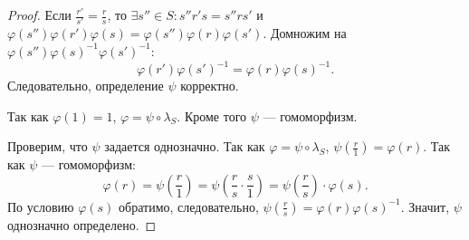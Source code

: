 \documentclass[11pt]{book}
\theoremstyle{definition}
\theoremstyle{plain}
\theoremstyle{plain}
\theoremstyle{definition}
\theoremstyle{remark}
\begin{document}
\begin{proof}
    Если $ \frac{r'}{s'} = \frac{r}{s}$, то $ \exists s'' \in S: s''r's = s''rs'$ и $ \varphi (s'')\varphi(r')\varphi(s) = \varphi (s'') \varphi (r) \varphi (s')$. Домножим на $ \varphi (s'') \varphi (s)^{-1} \varphi (s')^{-1}$:
    \[
	\varphi (r') \varphi (s')^{-1} = \varphi (r) \varphi (s)^{-1}
    .\]
    Следовательно, определение $ \psi$ корректно.

    Так как  $ \varphi (1) = 1$, $ \varphi = \psi \circ \lambda_S$.
    Кроме того $ \psi$ --- гомоморфизм.

    Проверим, что  $ \psi$ задается однозначно.
    Так как $ \varphi = \psi \circ \lambda_S$, $ \psi(\frac{r}{1}) = \varphi (r)$. Так как $ \psi$ --- гомоморфизм:
    \[
	\varphi (r) = \psi\left( \frac{r}{1} \right) = \psi\left( \frac{r}{s} \cdot \frac{s}{1} \right)   = \psi\left( \frac{r}{s} \right)\cdot \varphi (s)
    .\]
    По условию $ \varphi (s)$ обратимо, следовательно, $ \psi(\frac{r}{s}) =  \varphi (r) \varphi (s)^{-1}$. Значит, $ \psi$ однозначно определено.
\end{proof}
\end{document}
